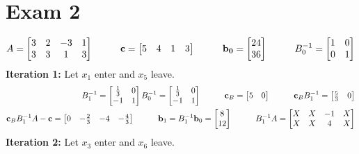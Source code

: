 \section{Exam 2}

\begin{equation*}
A = 
\begin{bmatrix}
 3 & 2 & -3 & 1 \\
 3 & 3 & 1 & 3
\end{bmatrix}
\hspace{1cm}
\mathbf{c} = 
\begin{bmatrix}
 5 & 4 & 1 & 3
\end{bmatrix}
\hspace{1cm}
\mathbf{b_0} = 
\begin{bmatrix}
 24 \\
 36
\end{bmatrix}
\hspace{1cm}
B_0^{-1} = 
\begin{bmatrix}
 1 & 0 \\
 0 & 1
\end{bmatrix}
\end{equation*}
\textbf{Iteration 1:}  Let $x_1$ enter and $x_5$ leave.
\begin{align*}
B_1^{-1} =  
\begin{bmatrix}
 \frac{1}{3} & 0 \\
 -1 & 1
\end{bmatrix}
  B_0^{-1}=  
\begin{bmatrix}
 \frac{1}{3} & 0 \\
 -1 & 1
\end{bmatrix}
\cm
\vec{c}_B = 
\begin{bmatrix}
  5 & 0
\end{bmatrix}
\cm
\vec{c}_B B_1^{-1} = 
\begin{bmatrix}
 \frac{5}{3} & 0
\end{bmatrix}
\\ %
\vec{c}_B B_1^{-1} A - \vec{c} = 
\begin{bmatrix}
 0 & -\frac{2}{3} & -4 & -\frac{4}{3}
\end{bmatrix}
\cm
\vec{b}_1 = B_1^{-1}\vec{b}_0 = 
\begin{bmatrix}
 8 \\
 12
\end{bmatrix}
\cm
B_1^{-1}A = 
\begin{bmatrix}
 X & X & -1 & X \\
 X & X & 4 & X
\end{bmatrix}
\end{align*}
\textbf{Iteration 2:}  Let $x_3$ enter and $x_6$ leave.
